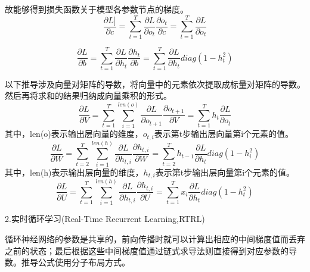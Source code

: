 \documentclass[openbib]{article}
\begin{document}
故能够得到损失函数关于模型各参数节点的梯度。
$$\frac{\partial L]}{\partial c}=\sum_{t=1}^{T}\frac{\partial L}{\partial o_t}\frac{\partial o_t}{\partial c}=\sum_{t=1}^{T}\frac{\partial L}{\partial o_t}$$

$$\frac{\partial L}{\partial b}=\sum_{t=1}^{T}\frac{\partial L}{\partial h_t}\frac{\partial h_t}{\partial b}=\sum_{t=1}^{T}\frac{\partial L}{\partial h_t}diag(1-h_t^2)$$

以下推导涉及向量对矩阵的导数，将向量中的元素依次提取成标量对矩阵的导数。然后再将求和的结果归纳成向量乘积的形式。
$$\frac{\partial L}{\partial V}=\sum_{t=1}^{T}\sum_{i=1}^{len(o)}\frac{\partial L}{\partial o_{t+1}}\frac{\partial o_{t+1}}{\partial V}=\sum_{t=1}^{T}h_t\frac{\partial L}{\partial o_t}$$
其中，len(o)表示输出层向量的维度，$o_{t,i}$表示第t步输出层向量第i个元素的值。
$$\frac{\partial L}{\partial W}=\sum_{t=2}^{T}\sum_{i=1}^{len(h)}\frac{\partial L}{\partial h_{t,i}}\frac{\partial h_{t,i}}{\partial W}=\sum_{t=2}^{T}h_{t-1}\frac{\partial L}{\partial h_t}diag(1-h_i^2)$$
其中，len(h)表示输出层向量的维度，$h_{t,i}$表示第t步输出层向量第i个元素的值。
$$\frac{\partial L}{\partial U}=\sum_{t=1}^{T}\sum_{i=1}^{len(h)}\frac{\partial L}{\partial h_{t,i}}\frac{\partial h_{t,i}}{\partial U}=\sum_{t=1}^{T}x_i\frac{\partial L}{\partial h_t}diag(1-h_t^2)$$

\begin{center}
	2.实时循环学习(Real-Time Recurrent Learning,RTRL)
\end{center}
循环神经网络的参数是共享的，前向传播时就可以计算出相应的中间梯度值而丢弃之前的状态；最后根据这些中间梯度值通过链式求导法则直接得到对应参数的导数。推导公式使用分子布局方式。
\end{document}
